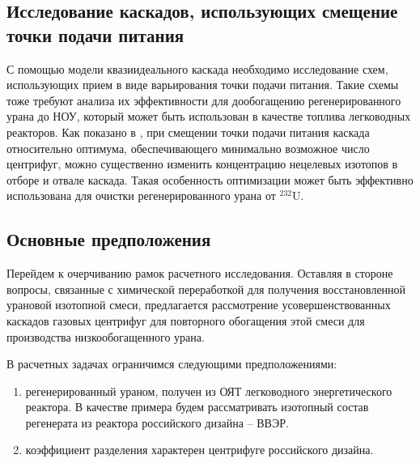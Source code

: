 \subsection{Исследование каскадов, использующих смещение точки подачи питания}
С помощью модели квазиидеального каскада необходимо исследование схем, использующих прием в виде варьирования точки подачи питания.
Такие схемы тоже требуют анализа их эффективности для дообогащению регенерированного урана до НОУ, который может быть использован в качестве топлива легководных реакторов.
Как показано в \cite{palk_2013}, при смещении точки подачи питания каскада относительно оптимума, обеспечивающего минимально возможное число центрифуг, можно существенно изменить концентрацию нецелевых изотопов в отборе и отвале каскада.
Такая особенность оптимизации может быть эффективно использована для очистки регенерированного урана от $^{232}$U.

\subsection{Основные предположения}

Перейдем к очерчиванию рамок расчетного исследования.
Оставляя в стороне вопросы, связанные с химической переработкой для получения восстановленной урановой изотопной смеси, предлагается рассмотрение усовершенствованных каскадов газовых центрифуг для повторного обогащения этой смеси для производства низкообогащенного урана. 

В расчетных задачах ограничимся следующими предположениями:

 \begin{enumerate}
  \item регенерированный ураном, получен из ОЯТ легководного энергетического реактора. В качестве примера будем рассматривать изотопный состав регенерата из реактора российского дизайна -- ВВЭР.
  \item коэффициент разделения характерен центрифуге российского дизайна.
\end{enumerate}